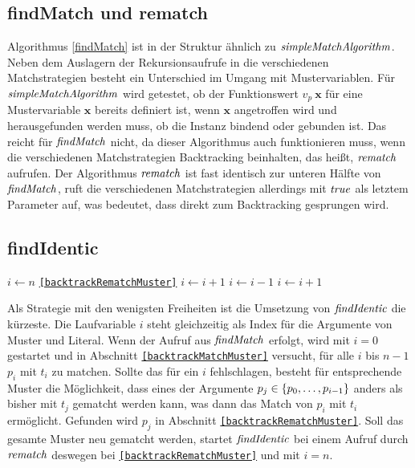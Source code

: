 \subsection{findMatch und rematch}
Algorithmus \ref{findMatch} ist in der Struktur ähnlich zu $\mathit{simpleMatchAlgorithm}$. Neben dem Auslagern der Rekursionsaufrufe in die verschiedenen Matchstrategien besteht ein Unterschied im Umgang mit Mustervariablen. Für $\mathit{simpleMatchAlgorithm}$ wird getestet, ob der Funktionswert $v_p~\mathbf x$ für eine Mustervariable $\mathbf x$ bereits definiert ist, wenn $\mathbf x$ angetroffen wird und herausgefunden werden muss, ob die Instanz bindend oder gebunden ist. Das reicht für $\mathit{findMatch}$ nicht, da dieser Algorithmus auch funktionieren muss, wenn die verschiedenen Matchstrategien Backtracking beinhalten, das heißt, $\mathit{rematch}$ aufrufen.
Der Algorithmus $\mathit{rematch}$ ist fast identisch zur unteren Hälfte von $\mathit{findMatch}$, ruft die verschiedenen Matchstrategien allerdings mit $\mathit{true}$ als letztem Parameter auf, was bedeutet, dass direkt zum Backtracking gesprungen wird.



\subsection {findIdentic}
\begin{algorithm}
\DontPrintSemicolon
\caption{$\Const{findIdentic} \colon M \times T \times \mathit{Bool} \rightarrow \mathit{Bool}$}\label{findIdentic}
\;
 {
	$i \leftarrow n$\;
	\Goto \texttt{\ref{backtrackRematchMuster}}\;
}
\Loop {} {
	 \label{backtrackMatchMuster}
	 {
		$i \leftarrow i + 1$\;
		 {}    
	}
	 \label{backtrackRematchMuster}
	 { 
		 {}
		$i \leftarrow i - 1$\;
	}    
	$i \leftarrow i + 1$\;
}
\end{algorithm}


Als Strategie mit den wenigsten Freiheiten ist die Umsetzung von $\mathit{findIdentic}$ die kürzeste. Die Laufvariable $i$ steht gleichzeitig als Index für die Argumente von Muster und Literal. Wenn der Aufruf aus $\mathit{findMatch}$ erfolgt, wird mit $i = 0$ gestartet und in Abschnitt \texttt{\ref{backtrackMatchMuster}} versucht, für alle $i$ bis $n-1$ $p_i$ mit $t_i$ zu matchen. Sollte das  für ein $i$ fehlschlagen, besteht für entsprechende Muster die Möglichkeit, dass eines der Argumente $p_j \in \{{p}_{0}, \dots, {p}_{i-1}\}$ anders als bisher mit $t_j$ gematcht werden kann, was dann das Match von $p_i$ mit $t_i$ ermöglicht. Gefunden wird $p_j$ in Abschnitt \texttt{\ref{backtrackRematchMuster}}. 
Soll das gesamte Muster neu gematcht werden, startet $\mathit{findIdentic}$ bei einem Aufruf durch $\mathit{rematch}$ deswegen bei \texttt{\ref{backtrackRematchMuster}} und mit $i = n$.

